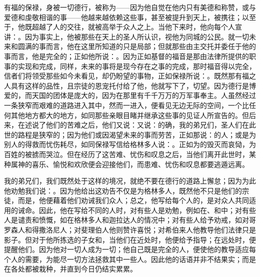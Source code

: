有福的保禄，身被一切德行，被称为——因为他自觉在他内只有美德和称赞，或与爱德和虔敬相谐的事——他越来越依赖这些事，甚至被提升到天上，被携往；以至于，他既超越了人的交往，就被高举于众人之上。当他下来时，他向每个人宣讲：。因为事实上，他被那些在天上的圣人所认识，视他为同城的公民。就一切未来和圆满的事而言，他在这里所知道的只是局部；但就那些由主交托并委任于他的事而言，他是完全的；正如他所说：。因为正如基督的福音是那由法律所提供的职事的实现和完成，同样，未来的事将是现今存在之事的完成，那时福音得以完全，信者们将领受那些如今未看见，却仍盼望的事物，正如保禄所说：。既然那有福之人具有这样的品性，且宗徒的恩宠托付给了他，他就写下了，切望。因为德行是博爱的，而天国的团体是庞大的，因为在那里有千千万万的万军事奉主。人虽然经过一条狭窄而艰难的道路进入其中，然而一进入，便看见无边无际的空间，一个比任何其他地方都大的地方，如同那些亲眼目睹并继承这些事的见证人所宣告的。但后来，在述说了他们的苦难之后，他们又说：又说：的确，我的弟兄们，圣人们在此世的路程是狭窄的；因为他们或因渴望未来的事而劳苦，正如那说：的人；或是为别人的得救而忧伤耗尽，如同保禄写信给格林多人说：。正如为的毁灭而哀恸，为百姓的被掳而哭泣。但在经历了这苦难、忧伤和叹息之后，当他们离开此世时，某种属神的喜乐、愉悦和欢欣便会迎接他们，而患难、忧伤和叹息都要逃遁远离。\par

我的弟兄们，我们既然处于这样的境况，就绝不要在德行的道路上懈怠；因为为此他劝勉我们说：。因为他给出这劝告不仅是为格林多人，既然他不只是他们的宗徒，而是，他便藉着他们劝诫我们众人；总之，他写给每个人的，是对众人共同适用的诫命。因此，他在写给不同的人时，对有些人是劝勉，例如在、和中；对有些人是谴责和愤慨，如在格林多人和迦拉达人的情况中；对有些人给予劝戒，如对哥罗森人和得撒洛尼人；对斐理伯人他则赞许喜悦；对希伯来人他教导他们法律只是影子。但对于他所拣选的子女和，当他们在近处时，他便给予指导；在远处时，便提醒他们。因为他对一切人成为一切；他自己既是完全的人，便使他的教导适应每个人的需要，为能尽一切方法拯救其中一些人。因此他的话语并非不结果实；而是在各处都被栽种，并直到今日仍结实累累。\par

